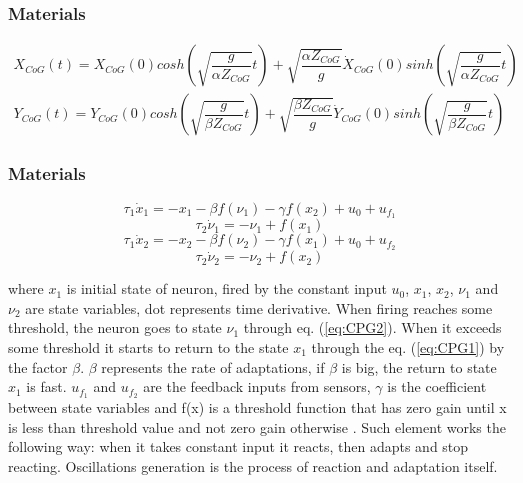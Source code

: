 \documentclass{beamer}
\begin{document}
	\begin{frame}
		\frametitle{Materials} 
		\begin{equation}\label{eq:CoG1}
			\begin{split}
			X_{CoG}(t) = X_{CoG}(0) cosh \left( \sqrt{\dfrac{g}{\alpha Z_{CoG}}} t \right) + \sqrt{\dfrac{\alpha Z_{CoG}}{g}} \dot{X}_{CoG}(0) sinh\left(\sqrt{\dfrac{g}{\alpha Z_{CoG}} } t\right)\\
			Y_{CoG}(t) = Y_{CoG}(0) cosh \left( \sqrt{\dfrac{g}{\beta Z_{CoG}}} t \right) + \sqrt{\dfrac{\beta Z_{CoG}}{g}} \dot{Y}_{CoG}(0) sinh \left( \sqrt{\dfrac{g}{\beta Z_{CoG}}} t \right)
		\end{split}
		\end{equation}		
	\end{frame}
	

	\begin{frame}
		\frametitle{Materials} 
		\begin{equation}\label{eq:CPG1}
		\tau_1 \dot{x}_1 = -x_1 - \beta f(\nu_1) -  \gamma f(x_2) + u_0 + u_{f_1}
		\end{equation}
		\begin{equation}\label{eq:CPG2}
		\tau_2 \dot{\nu}_1 = -\nu_1  + f(x_1)
		\end{equation}
		\begin{equation}\label{eq:CPG3}
		\tau_1 \dot{x}_2 = -x_2 - \beta f(\nu_2) -  \gamma f(x_1) + u_0 + u_{f_2}
		\end{equation}
		\begin{equation}\label{eq:CPG4}
		\tau_2 \dot{\nu}_2 = -\nu_2  + f(x_2)
		\end{equation}
		
		where $x_1$  is initial state of neuron, fired by the constant input $u_0$, $x_1$, $x_2$, $\nu_1$ and $\nu_2$ are state variables, dot represents time derivative.  When firing reaches some threshold, the neuron goes to state $\nu_1$ through eq. (\ref{eq:CPG2}). When it exceeds some threshold it starts to return to the state $x_1$ through the eq. (\ref{eq:CPG1}) by the factor $\beta$. $\beta$ represents the rate of adaptations, if $\beta$ is big, the return to state $x_1$ is fast. $u_{f_1}$ and $u_{f_2}$ are the feedback inputs from sensors, $\gamma$ is the coefficient between state variables and f(x) is a threshold function that has zero gain until x is less than threshold value and not zero gain otherwise . Such element works the following way: when it takes constant input it reacts, then adapts and stop reacting. Oscillations generation is the process of reaction and adaptation itself.
	\end{frame}
	
\end{document}
